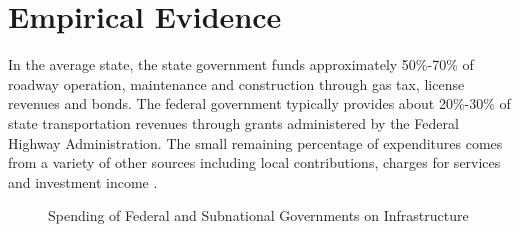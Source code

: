 \section{Empirical Evidence}
In the average state, the state government funds approximately 50\%-70\% of roadway operation, maintenance and construction through gas tax, license revenues and bonds. The federal government typically provides about 20\%-30\% of state transportation revenues through grants administered by the Federal Highway Administration. The small remaining percentage of expenditures comes from a variety of other sources including local contributions, charges for services and investment income \cite{nicholson2011claiming}.
\begin{figure}[H]
    \centering
    \caption{Spending of Federal and Subnational Governments on Infrastructure}
    \label{spendingonins}
\end{figure}


